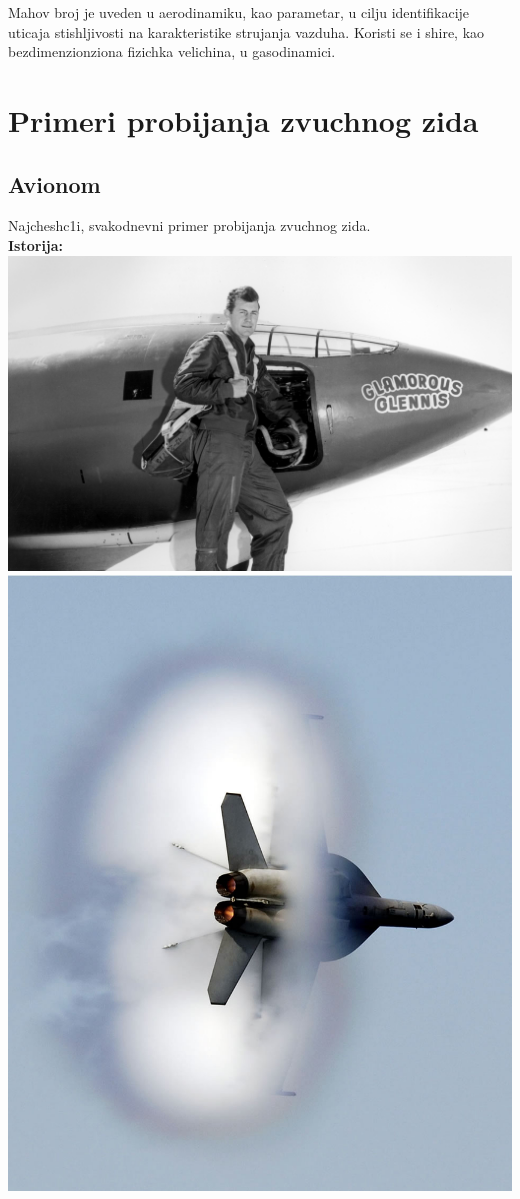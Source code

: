 \documentclass[11pt]{article}
\begin{document}
Mahov broj je uveden u aerodinamiku, kao parametar, u cilju identifikacije uticaja stish\/ljivosti na karakteristike strujanja vazduha. Koristi se i shire, kao bezdimenzionziona fizichka velichina, u gasodinamici.

\newpage
\section{Primeri probijanja zvuchnog zida}
\subsection{Avionom}
Najchesh\/c1i, svakodnevni primer probijanja zvuchnog zida.\\

\textbf{Istorija:}\\
\includegraphics[scale=0.1]{Chuck_Yeager.jpg}
\includegraphics[scale=0.178]{F-18-diamondback_blast.jpg}\\
\end{document}
